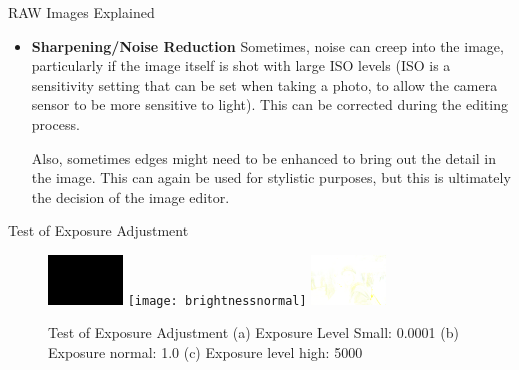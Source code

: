 \documentclass[final]{beamer}
\begin{document}
\begin{frame}{}
\begin{columns}[t]
\begin{column}{.48\linewidth}
\begin{block}{RAW Images Explained}
\begin{itemize}
          \item \textbf{Sharpening/Noise Reduction}
          Sometimes, noise can creep into the image, particularly if the image itself is shot with large ISO levels (ISO is a sensitivity setting that can be
          set when taking a photo, to allow the camera sensor to be more sensitive to light). This can be corrected
          during the editing process.
          
          Also, sometimes edges might need to be enhanced to bring out the detail in the image. This can again be used for stylistic purposes, but this is ultimately the
          decision of the image editor.
          \end{itemize}
        \end{block}
       
        \begin{block}{Test of Exposure Adjustment}
          \begin{figure}\label{exposuretest}
            \centering
            \subfigure
            {
                \includegraphics[width=75px]{brightnesspoint0001}
            }
            \subfigure
            {
                \texttt{[image: brightnessnormal]}
            }
            \subfigure
            {
                \includegraphics[width=75px]{brightness5000}
            }
            \caption{
                Test of Exposure Adjustment 
                (a) Exposure Level Small: 0.0001
                (b) Exposure normal: 1.0
                (c) Exposure level high: 5000
            }
         \end{figure}

        \end{block}


\end{column}
\end{columns}
\end{frame}
\end{document}
